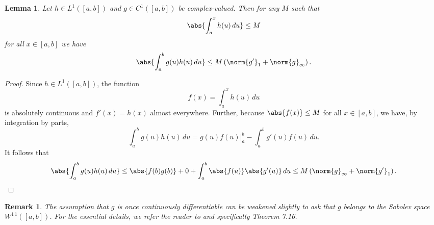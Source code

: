 \documentclass[11pt, letter]{book}
\newtheorem{lemma}[theorem]{Lemma}
\newtheorem{remark}{Remark}
\newcommand{\lp}{\left(}
\newcommand{\rp}{\right)}
\begin{document}
\begin{framed}
\begin{lemma}\label{lem:setup_VdC}
Let $h\in L^1([a,b])$ and $g\in C^1([a,b])$ be complex-valued. Then for any $M$ such that
\begin{equation*}
    \abs{\int^x_a h(u)\,du} \leq M
\end{equation*}
for all $x\in [a,b]$ we have
\begin{equation*}
    \abs{\int^b_a g(u)h(u)\,du} \leq M \lp \norm{g'}_1 + \norm{g}_\infty \rp.
\end{equation*}
\end{lemma}
\end{framed}
\begin{proof}
Since $h\in L^1([a,b])$, the function 
\begin{equation*}
    f(x) = \int^x_a h(u)\,du
\end{equation*}
is absolutely continuous and $f'(x) = h(x)$ almost everywhere. Further, because $\abs{f(x)} \leq M$ for all $x\in [a,b]$, we have, by integration by parts,
\begin{equation*}
    \int^b_a g(u)h(u)\,du = g(u)f(u)\big\vert^b_a - \int^b_a g'(u)f(u)\,du.
\end{equation*}
It follows that
\begin{eqnarray*}
    \abs{\int^b_a g(u)h(u)\,du} 
    \leq \abs{f(b)g(b)} + 0 + \int^b_a \abs{f(u)} \abs{g'(u)}\,du \leq M\lp \norm{g}_\infty + \norm{g'}_1 \rp. 
\end{eqnarray*}
\end{proof}


\begin{remark}
The assumption that $g$ is once continuously differentiable can be weakened slightly to ask that $g$ belongs to the Sobolev space $W^{1\,1}([a,b])$. For the essential details, we refer the reader to \cite{leoni2017first} and specifically Theorem 7.16.
\end{remark}
\end{document}
